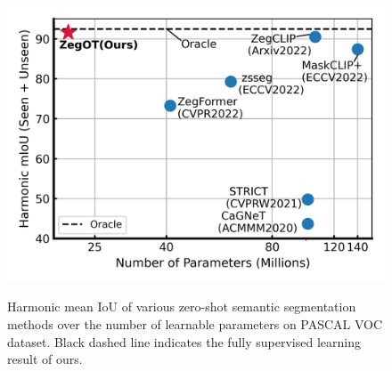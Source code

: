 \documentclass[nohyperref]{article}
\theoremstyle{plain}
\theoremstyle{definition}
\theoremstyle{remark}
\begin{document}

\begin{figure}[!t]
\vskip 0.1in
\begin{center}
\includegraphics[width=0.98\linewidth]{fig/figure1.jpg}
\vspace*{-0.5cm}
{\caption{Harmonic mean IoU of various zero-shot semantic segmentation methods over the number of learnable parameters on PASCAL VOC dataset.
Black dashed line indicates the fully supervised learning result of ours. }}
\label{figure1}
\end{center}
\vskip -0.1in
\end{figure}



\end{document}
